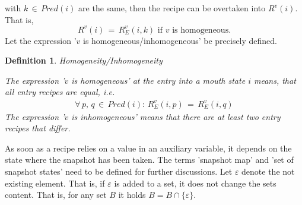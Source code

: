 \documentclass[12pt,a4paper]{scrartcl}
\newtheorem{definition}{Definition}
\begin{document}
with $k\,\in\,Pred(i)$ are the same, then the recipe can be overtaken into
$R^v(i)$. That is,
\begin{equation}
    R^v(i) \,=\, R^v_E(i,k)\,\,\mbox{if $v$ is homogeneous}.
\end{equation}
Let the expression '$v$ is homogeneous/inhomogeneous' be precisely defined.
\begin{definition} Homogeneity/Inhomogeneity

    The expression '$v$ is homogeneous' at the entry into a mouth state $i$
    means, that all entry recipes are equal, i.e.
    \begin{equation}
        \begin{aligned}
        \forall\,p,\,q\,\in\,Pred(i):\,R_E^v(i,p)\,=\,R_E^v(i,q) 
        \end{aligned}
    \end{equation}
    The expression '$v$ is inhomogeneous' means that there are at least two
    entry recipes that differ.
\end{definition}

As soon as a recipe relies on a value in an auxiliary variable, it depends on
the state where the snapshot has been taken. The terms 'snapshot map' and 'set
of snapshot states' need to be defined for further discussions. Let
$\varepsilon$ denote the not existing element. That is, if $\varepsilon$ is
added to a set, it does not change the sets content. That is, for any set $B$
it holds $B = B \cap \{ \varepsilon \}$.
\end{document}
